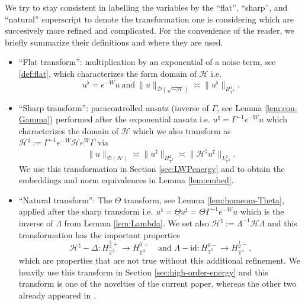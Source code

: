 We try to stay consistent in labelling the variables by the ``flat'',
``sharp'', and ``natural'' superscript to denote the transformation one is
considering which are succesively more refined and complicated. For the
convenience of the reader, we briefly summarize their definitions and where
they are used.
\begin{itemize}
  \item ``Flat transform'': multiplication by an exponential of a
  noise term, see \eqref{def:flat}, which characterizes the form domain of
  $\mathcal{H}$ i.e. 
  \begin{equation*}
  u^{\flat} = e^{- W} u \ \mathrm{and} \ \| u \|_{\mathcal{D} \left(
  \sqrt{- \mathcal{H}} \right)} \asymp \| u^{\flat} \|_{H_{\mathbb{T}^3}^1}.
  \end{equation*}
  
  \item ``Sharp transform'': paracontrolled ansatz (inverse of
  $\Gamma$, see Lemma \ref{lem:con-Gamma}) performed after the exponential
  ansatz i.e. $u^{\sharp} = \Gamma^{- 1} e^{- W} u$ which characterizes the
  domain of $\mathcal{H}$ which we also transform as $\mathcal{H}^{\sharp}
  := \Gamma^{- 1} e^{- W} \mathcal{H} e^W \Gamma$ via
  \[ \| u \|_{\mathcal{D} (\mathcal{H})} \asymp \| u^{\sharp}
     \|_{H_{\mathbb{T}^3}^2} \asymp \| \mathcal{H}^{\sharp} u^{\sharp}
     \|_{L_{\mathbb{T}^3}^2} . \]
  We use this transformation in Section \ref{sec:LWPenergy} and to obtain the
  embeddings and norm equivalences in Lemma \ref{lem:embed}.
  
  \item ``Natural transform'': The $\Theta$ transform, see Lemma
  \ref{lem:homeom-Theta}, applied after the sharp transform i.e. $u^{\natural}
  = \Theta u^{\sharp} = \Theta \Gamma^{- 1} e^{- W} u$ which is the inverse of
  $\Lambda$ from Lemma \ref{lem:Lambda}. We set also $\mathcal{H}^{\natural}
  := \Lambda^{- 1} \mathcal{H} \Lambda$ and this transformation has the
  important properties
  \[ \mathcal{H}^{\natural} - \Delta : H_{\mathbb{T}^3}^{\frac{3}{2} +}
     \rightarrow H_{\mathbb{T}^3}^{0 +} \quad \text{and } \Lambda - \mathrm{id}
     : H_{\mathbb{T}^3}^{0 -} \rightarrow H_{\mathbb{T}^3}^{\frac{1}{2} -}, \]
  which are properties that are not true without this additional refinement.
  We heavily use this transform in Section \ref{sec:high-order-energy} and
  this transform is one of the novelties of the current paper, whereas the
  other two already appeared in {\cite{GUZ20}}.
\end{itemize}